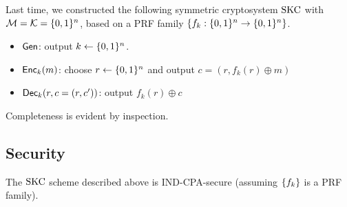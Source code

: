 \documentclass[11pt]{article}
\begin{document}
Last time, we constructed the following symmetric cryptosystem $\text{SKC}$
with $\mathcal{M} = \mathcal{K} = \{0,1\}^{n}$, based on a PRF family
$\{f_{k} : \{0,1\}^{n} \to \{0,1\}^{n}\}$.

\begin{itemize}
\item $\mathsf{Gen}$: output $k \gets \{0,1\}^{n}$.
\item $\mathsf{Enc}_{k}(m)$: choose $r \gets \{0,1\}^{n}$ and output $c = (r,
  f_{k}(r) \oplus m)$
\item $\mathsf{Dec}_{k}(r, c = (r,c'))$: output $f_{k}(r) \oplus c$
\end{itemize}
Completeness is evident by inspection.

\subsection{Security}
\label{sec:security}

\begin{theorem}
  The $\text{SKC}$ scheme described above is IND-CPA-secure (assuming
  $\{f_{k}\}$ is a PRF family).
\end{theorem}
\end{document}
